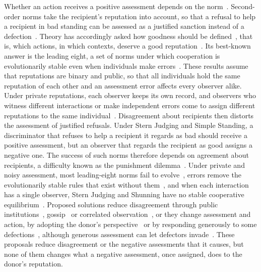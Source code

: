 \documentclass[10pt]{wlscirep}
\theoremstyle{plain}
\theoremstyle{remark}
\begin{document}
Whether an action receives a positive assessment depends on the norm~\cite{brandt2004,ohtsuki2004}. Second-order norms take the recipient's reputation into account, so that a refusal to help a recipient in bad standing can be assessed as a justified sanction instead of a defection~\cite{sugden1986,leimar2001,panchanathan2003}. Theory has accordingly asked how goodness should be defined~\cite{ohtsuki2004}, that is, which actions, in which contexts, deserve a good reputation~\cite{santos2018,kessinger2023,murase2024computational}. Its best-known answer is the leading eight, a set of norms under which cooperation is evolutionarily stable even when individuals make errors~\cite{ohtsuki2004,ohtsuki2006}. These results assume that reputations are binary and public, so that all individuals hold the same reputation of each other and an assessment error affects every observer alike. Under private reputations, each observer keeps its own record, and observers who witness different interactions or make independent errors come to assign different reputations to the same individual~\cite{takahashi2006,uchida2010,uchida2013,hilbe2018}. Disagreement about recipients then distorts the assessment of justified refusals. Under Stern Judging and Simple Standing, a discriminator that refuses to help a recipient it regards as bad should receive a positive assessment, but an observer that regards the recipient as good assigns a negative one. The success of such norms therefore depends on agreement about recipients, a difficulty known as the punishment dilemma~\cite{okada2020dilemmas,michelmata2024}. Under private and noisy assessment, most leading-eight norms fail to evolve~\cite{hilbe2018}, errors remove the evolutionarily stable rules that exist without them~\cite{perret2021}, and when each interaction has a single observer, Stern Judging and Shunning have no stable cooperative equilibrium~\cite{okada2018}. Proposed solutions reduce disagreement through public institutions~\cite{radzvilavicius2021}, gossip~\cite{kawakatsu2024} or correlated observation~\cite{murase2024synchronization}, or they change assessment and action, by adopting the donor's perspective~\cite{radzvilavicius2019} or by responding generously to some defections~\cite{okada2020dilemmas,schmid2021nhb}, although generous assessment can let defectors invade~\cite{schmid2021}. These proposals reduce disagreement or the negative assessments that it causes, but none of them changes what a negative assessment, once assigned, does to the donor's reputation.
\end{document}
